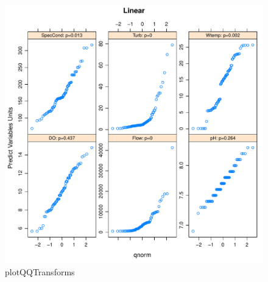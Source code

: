 \documentclass[a4paper,11pt]{article}\usepackage[]{graphicx}\usepackage[]{color}
\makeatletter
\def\maxwidth{ %
  \ifdim\Gin@nat@width>\linewidth
    \linewidth
  \else
    \Gin@nat@width
  \fi
}
\newenvironment{knitrout}{}{} %
\makeatother
\begin{document}
\begin{knitrout}
\begin{figure}[]
\includegraphics[width=\maxwidth]{figure/plotQQTransforms2} \caption[plotQQTransforms]{plotQQTransforms\label{fig:plotQQTransforms2}}
\end{figure}


\end{knitrout}
\end{document}
